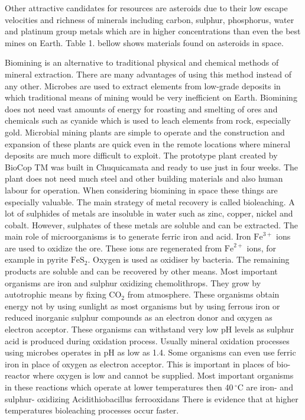 \documentclass[12pt]{article}
\begin{document}
Other attractive candidates for resources are asteroids due to their low escape velocities and richness of minerals including carbon, sulphur, phosphorus, water and platinum group metals which are in higher concentrations than even the best mines on Earth. Table 1. bellow shows materials found on asteroids in space.


Biomining is an alternative to traditional physical and chemical methods of mineral extraction. There are many advantages of using this method instead of any other. Microbes are used to extract elements from low-grade deposits in which traditional means of mining would be very inefficient on Earth. Biomining does not need vast amounts of energy for roasting and smelting of ores and chemicals such as cyanide which is used to leach elements from rock, especially
gold. Microbial mining plants are simple to operate and the construction and expansion of these plants are quick even in the remote locations where mineral deposits are much more difficult to exploit. The prototype plant created by BioCop TM was built in Chuquicamata and ready to use just in four weeks. The plant does not need much steel and other building materials and also
human labour for operation. When considering biomining in space these things are especially valuable. The main strategy of metal recovery is called bioleaching. A lot of sulphides of metals are insoluble in water such as zinc, copper, nickel and cobalt. However, sulphates of these metals are soluble and can be extracted. The main role of microorganisms is to generate ferric iron and acid. Iron $\mathrm{Fe}^{3+}$ ions are used to oxidize the ore. These ions are regenerated from $\mathrm{Fe}^{2+}$
ions, for example in pyrite $\mathrm{FeS}_{2}$. Oxygen is used as oxidiser by bacteria. The remaining products are soluble and can be recovered by other means. Most important organisms are iron and sulphur oxidizing chemolithrops. They grow by autotrophic means by fixing $\mathrm{CO}_2$ from atmosphere. These organisms obtain energy not by using sunlight as most organisms but by using ferrous iron or reduced inorganic sulphur compounds as an electron donor and oxygen as electron acceptor. These organisms can withstand very low pH levels as sulphur acid is produced during oxidation process. Usually mineral oxidation processes using microbes operates in pH as low as 1.4.\cite{} Some organisms can even use ferric iron in place of oxygen as electron acceptor. This is important in places of bio-reactor where oxygen is low and cannot be supplied. Most important organisms in these reactions which operate at lower temperatures then 40$\,^{\circ}\mathrm{C}$ are iron- and sulphur- oxidizing Acidithiobacillus ferrooxidans There is evidence that at higher temperatures bioleaching processes occur faster.\cite{}
\end{document}
